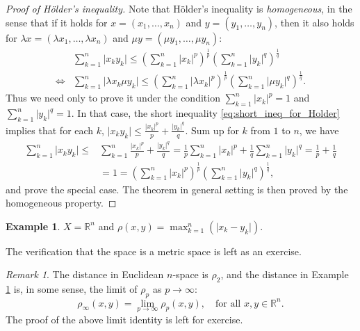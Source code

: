\documentclass[a4paper,12pt]{article}
\newcommand{\Holder}{H\"{o}lder}
\newcommand{\realR}{\mathbb{R}}
\theoremstyle{definition}
\newtheorem{expl}[thm]{Example}
\theoremstyle{remark}
\newtheorem{rmk}[thm]{Remark}
\begin{document}
\begin{proof}[Proof of \Holder's inequality]
  Note that \Holder's inequality is \emph{homogeneous}, in the sense that if it holds for $x = (x_1, \dotsc, x_n)$ and $y = (y_1, \dotsc, y_n)$, then it also holds for $\lambda x = (\lambda x_1, \dotsc, \lambda x_n)$ and $\mu y = (\mu y_1, \dotsc, \mu y_n)$:
  \begin{equation*}
    \begin{split}
      & \sum^n_{k=1} \lvert x_k y_k \rvert \leq \left( \sum^n_{k=1} \lvert x_k \rvert^p \right)^{\frac{1}{p}}  \left( \sum^n_{k=1} \lvert y_k \rvert^q \right)^{\frac{1}{q}} \\
      \Longleftrightarrow {}& \sum^n_{k=1} \lvert \lambda x_k \mu y_k \rvert \leq \left( \sum^n_{k=1} \lvert \lambda x_k \rvert^p \right)^{\frac{1}{p}}  \left( \sum^n_{k=1} \lvert \mu y_k \rvert^q \right)^{\frac{1}{q}}.
    \end{split}
  \end{equation*}
Thus we need only to prove it under the condition $\sum^n_{k=1} \lvert x_k \rvert^p = 1$ and $\sum^n_{k=1} \lvert y_k \rvert^q = 1$. In that case, the short inequality \eqref{eq:short_ineq_for_Holder} implies that for each $k$, $\lvert x_k y_k \rvert \leq \frac{\lvert x_k \rvert^p}{p} + \frac{\lvert y_k \rvert^q}{q}$. Sum up for $k$ from $1$ to $n$, we have
\begin{equation*}
  \begin{split}
    \sum^n_{k=1} \lvert x_k y_k \rvert \leq {}& \sum^n_{k=1} \frac{\lvert x_k \rvert^p}{p} + \frac{\lvert y_k \rvert^q}{q} = \frac{1}{p}\sum^n_{k=1} \lvert x_k \rvert^p + \frac{1}{q}\sum^n_{k=1} \lvert y_k \rvert^q = \frac{1}{p} + \frac{1}{q} \\
    & = 1 = \left( \sum^n_{k=1} \lvert x_k \rvert^p \right)^{\frac{1}{p}}  \left( \sum^n_{k=1} \lvert y_k \rvert^q \right)^{\frac{1}{q}},
  \end{split}
\end{equation*}
and prove the special case. The theorem in general setting is then proved by the homogeneous property.
\end{proof}

\begin{expl} \label{expl:rho_infty_R^n}
  $X = \realR^n$ and $\rho(x,y) = \max^n_{k=1}(\lvert x_k - y_k \rvert)$.
\end{expl}
The verification that the space is a metric space is left as an exercise.
\begin{rmk}
  The distance in Euclidean $n$-space is $\rho_2$, and the distance in Example \ref{expl:rho_infty_R^n} is, in some sense, the limit of $\rho_p$ as $p \to \infty$:
  \begin{equation*}
    \rho_{\infty}(x, y) = \lim_{p \to \infty} \rho_p(x, y), \quad \text{for all $x, y \in \realR^n$.}
  \end{equation*}
  The proof of the above limit identity is left for exercise.
\end{rmk}
\end{document}
